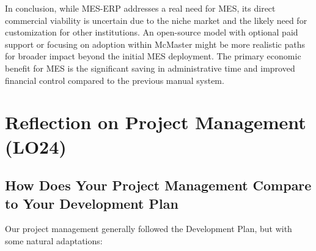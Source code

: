 \documentclass{article}
\begin{document}
In conclusion, while MES-ERP addresses a real need for MES, its direct commercial viability is uncertain due to the niche market and the likely need for customization for other institutions. An open-source model with optional paid support or focusing on adoption within McMaster might be more realistic paths for broader impact beyond the initial MES deployment. The primary economic benefit for MES is the significant saving in administrative time and improved financial control compared to the previous manual system.

\section{Reflection on Project Management (LO24)}


\subsection{How Does Your Project Management Compare to Your Development Plan}

Our project management generally followed the Development Plan, but with some natural adaptations:
\end{document}
